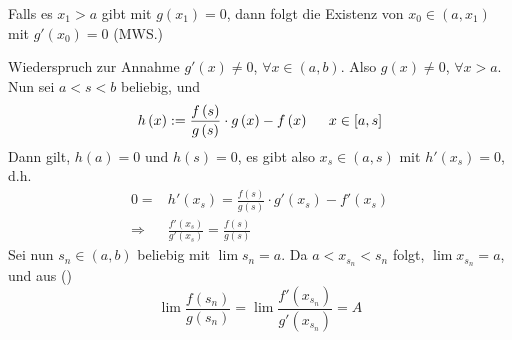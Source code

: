 \begin{beweis}{}
Falls es $x_1>a$ gibt mit $g\left( x_1\right)=0$, dann folgt die Existenz von $x_0\in\left( a,x_1\right)$ mit $g'\left( x_0\right)=0$ (MWS.)

\begin{center}
\end{center}

Wiederspruch zur Annahme $g'(x)\not=0$, $\forall x\in\left( a,b\right)$. Also $g(x)\not=0$, $\forall x>a$. Nun sei $a<s<b$ beliebig, und
\[h\left( x \right): = \frac{{f\left( s \right)}}{{g\left( s \right)}} \cdot g\left( x \right) - f\left( x \right)\hspace{5mm}x \in \left[ {a,s} \right]\]
Dann gilt, $h(a)=0$ und $h(s)=0$, es gibt also $x_s\in\left( a,s\right)$ mit $h'\left( x_s\right)=0$, d.h.
\begin{align*}
0 =& h'\left( {{x_s}} \right) = \frac{{f\left( s \right)}}{{g\left( s \right)}} \cdot g'\left( {{x_s}} \right) - f'\left( {{x_s}} \right)\\
 \Rightarrow& \frac{{f'\left( {{x_s}} \right)}}{{g'\left( {{x_s}} \right)}} = \frac{{f\left( s \right)}}{{g\left( s \right)}}\tag{\textasteriskcentered}
\end{align*}
Sei nun $s_n\in\left( a,b\right)$ beliebig mit $\lim s_n=a$. Da $a<x_{s_n}<s_n$ folgt, $\lim x_{s_n}=a$, und aus (\textasteriskcentered)
\[\lim \frac{{f\left( {{s_n}} \right)}}{{g\left( {{s_n}} \right)}} = \lim \frac{{f'\left( {{x_{{s_n}}}} \right)}}{{g'\left( {{x_{{s_n}}}} \right)}} = A\]
\end{beweis}

